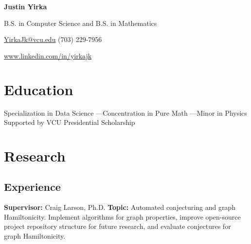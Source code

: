\documentclass[11pt,letterpaper,serif]{moderncv}
\begin{document}

\thispagestyle{firstpage}

\begin{center}
	{\huge\textbf{Justin Yirka}}
	
	B.S. in Computer Science and B.S. in Mathematics
	
	\href{mailto:yirkajk@vcu.edu}{YirkaJk@vcu.edu} \hspace{2em} (703) 229-7956
	
	\url{www.linkedin.com/in/yirkajk}	
\end{center}


\setlength{\parskip}{0em}
\setlength\bibitemsep{\parskip}


\vspace{-2em}
\section{Education}
\vspace{-1.5em}
{	
	\begin{adjustwidth}{.25in}{}
		Specialization in Data Science \quad---\quad Concentration in Pure Math \quad---\quad Minor in Physics \newline
		Supported by VCU Presidential Scholarship
	\end{adjustwidth}
}


\section{Research}
\subsection{Experience}
{	
	\begin{adjustwidth}{.25in}{}
		\textbf{Supervisor:} Craig Larson, Ph.D. \newline
		\textbf{Topic:} Automated conjecturing and graph Hamiltonicity. Implement algorithms for graph properties, improve open-source project repository structure for future research, and evaluate conjectures for graph Hamiltonicity.
	\end{adjustwidth}
}
\end{document}
